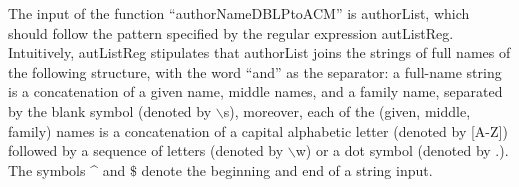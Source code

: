 
The input of the function ``authorNameDBLPtoACM'' is {\sf authorList}, which should follow the pattern specified by the regular expression {\sf autListReg}. Intuitively, {\sf autListReg} stipulates that {\sf authorList} %
joins the strings of full names of the following structure, with the word ``and'' as the separator: a full-name string is a concatenation of a given name, middle names, and a family name, separated by the blank symbol (denoted by $\backslash$s), moreover, each of the (given, middle, family) names is a concatenation of a capital alphabetic letter (denoted by [A-Z]) followed by a sequence of letters (denoted by $\backslash$w) or a dot symbol (denoted by $.$).
The symbols \^{} and $\$$ denote the beginning and end of a string input.

